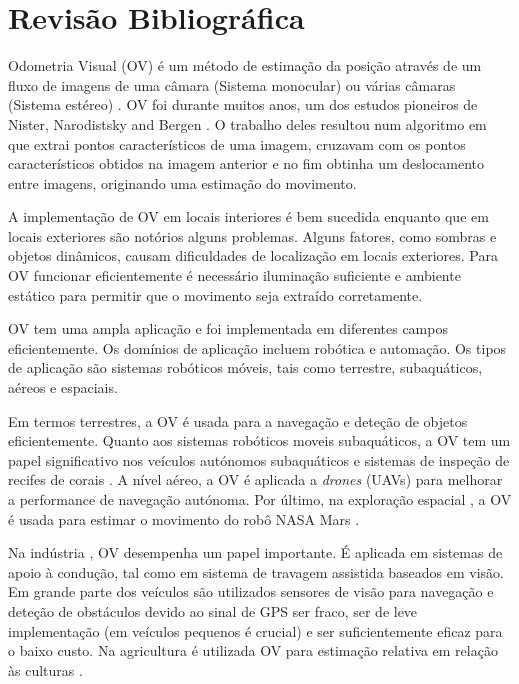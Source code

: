 \chapter{Revisão Bibliográfica}\label{chap:odometria visual}


Odometria Visual (OV) é um método de estimação da posição através de um fluxo de imagens de uma câmara (Sistema monocular) ou várias câmaras (Sistema estéreo) \cite{Ericson2018}. OV foi durante muitos anos, um dos estudos pioneiros de Nister, Narodistsky and Bergen \cite{Nisterb}. O trabalho deles resultou num algoritmo em que extrai pontos característicos de  uma imagem, cruzavam com os pontos característicos obtidos na imagem anterior e no fim obtinha um deslocamento entre imagens, originando uma estimação do movimento. 



A implementação de OV em locais interiores é bem sucedida enquanto que em locais exteriores são notórios alguns problemas. Alguns fatores, como sombras e objetos dinâmicos, causam  dificuldades de localização em locais exteriores. Para OV funcionar eficientemente é necessário iluminação suficiente e ambiente estático para permitir que o movimento seja extraído corretamente. 

OV tem uma ampla aplicação e foi implementada em diferentes campos eficientemente. Os domínios de aplicação incluem robótica e automação. Os tipos de aplicação são sistemas robóticos móveis, tais como terrestre, subaquáticos, aéreos e espaciais.

Em termos terrestres, a OV é usada para a navegação e deteção de objetos eficientemente. Quanto aos sistemas robóticos moveis subaquáticos, a OV tem um papel significativo nos veículos autónomos subaquáticos e sistemas de inspeção de recifes de corais \cite{Aqel2016}. A nível aéreo, a OV é aplicada a \textit{drones} (UAVs) para melhorar a performance de navegação autónoma. Por último, na exploração espacial , a OV é usada para estimar o movimento do robô NASA Mars  \cite{Cheng} .


Na indústria , OV desempenha um papel importante. É aplicada em sistemas de apoio à condução, tal como em sistema de travagem assistida baseados em visão.  Em grande parte dos veículos são utilizados sensores de visão para navegação e deteção de obstáculos devido ao sinal de GPS ser fraco, ser de leve implementação (em veículos pequenos é crucial) e ser suficientemente eficaz para o baixo custo.  Na agricultura é utilizada OV para estimação relativa em relação às culturas \cite{ericson2008visual,Mendes2016}.


